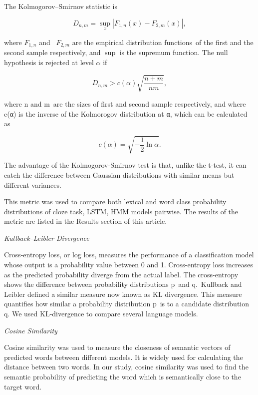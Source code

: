 \documentclass[a4paper]{article}
\newcommand{\head}[1]{\vspace{0.5em}\emph{#1}\vspace{0.25em}}
\begin{document}
The Kolmogorov–Smirnov statistic is 

\[ {D_{n,m}=\sup _{x}|F_{1,n}(x)-F_{2,m}(x)|,} \]


where \({F_{1,n}}\) and  \({F_{2,m}}\) are the empirical distribution
functions of the first and the second sample respectively, and
\({\sup}\)
is the supremum function. The null hypothesis is rejected at level
\({\alpha }\) if 

\[ {D_{n,m}>c(\alpha ){\sqrt {\frac {n+m}{nm}}},} \]

where {n} and {m} are the sizes of first and second sample respectively, and where c(α) is the inverse of the Kolmorogov distribution at α, which can be calculated as 


\[ { c\left(\alpha \right)={\sqrt {-{\frac {1}{2}}\ln \alpha }}.} \]

The advantage of the Kolmogorov-Smirnov test is that, unlike the t-test, it can catch the difference between Gaussian distributions with similar means but different variances.

This metric was used to compare both lexical and word class probability distributions of cloze task, LSTM, HMM models pairwise. The results of the metric are listed in the Results section of this article.

\head{Kullback–Leibler Divergence}

Cross-entropy loss, or log loss, measures the performance of a classification model whose output is a probability value between 0 and 1. Cross-entropy loss increases as the predicted probability diverge from the actual label. The cross-entropy shows the difference between probability distributions p and q. Kullback and Leibler defined a similar measure now known as KL divergence. This measure quantifies how similar a probability distribution p is to a candidate distribution q. We used KL-divergence to compare several language models.

\head{Cosine Similarity}

Cosine similarity was used to measure the closeness of semantic vectors of predicted words between different models. It is widely used for calculating the distance between two words. In our study, cosine similarity was used to find the semantic probability of predicting the word which is semantically close to the target word. 
%
%
%
%
%
\end{document}
